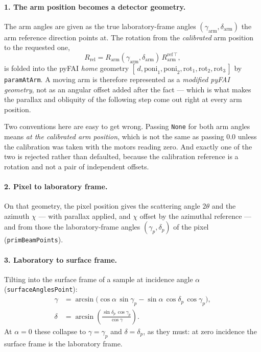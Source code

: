 \documentclass[11pt,a4paper]{article}
\newcommand{\code}[1]{\texttt{\small #1}}
\begin{document}
\paragraph{1. The arm position becomes a detector geometry.} The arm angles
are given as the true laboratory-frame angles
$(\gamma_{\mathrm{arm}}, \delta_{\mathrm{arm}})$ the arm reference direction
points at. The rotation from the \emph{calibrated} arm position to the
requested one,
\begin{equation}
  R_{\mathrm{rel}} = R_{\mathrm{arm}}(\gamma_{\mathrm{arm}},
                                      \delta_{\mathrm{arm}})\,
                     R_{\mathrm{arm}}^{\mathrm{ref}\,\top} ,
\end{equation}
is folded into the pyFAI \emph{home} geometry
$[\,d, \mathrm{poni}_1, \mathrm{poni}_2, \mathrm{rot}_1, \mathrm{rot}_2,
\mathrm{rot}_3\,]$ by \code{paramAtArm}. A moving arm is therefore represented
as a \emph{modified pyFAI geometry}, not as an angular offset added after the
fact --- which is what makes the parallax and obliquity of the following step
come out right at every arm position.

Two conventions here are easy to get wrong. Passing \code{None} for both arm
angles means \emph{at the calibrated arm position}, which is not the same as
passing $0.0$ unless the calibration was taken with the motors reading zero.
And exactly one of the two is rejected rather than defaulted, because the
calibration reference is a rotation and not a pair of independent offsets.

\paragraph{2. Pixel to laboratory frame.} On that geometry, the pixel position
gives the scattering angle $2\theta$ and the azimuth $\chi$ --- with parallax
applied, and $\chi$ offset by the azimuthal reference --- and from those the
laboratory-frame angles $(\gamma_p, \delta_p)$ of the pixel
(\code{primBeamPoints}).

\paragraph{3. Laboratory to surface frame.} Tilting into the surface frame of
a sample at incidence angle $\alpha$ (\code{surfaceAnglesPoint}):
\begin{align}
  \gamma &= \arcsin\bigl(\cos\alpha \, \sin\gamma_p
            - \sin\alpha \, \cos\delta_p \, \cos\gamma_p \bigr) ,
  \label{eq:gamma}\\[2pt]
  \delta &= \arcsin\!\left(
            \frac{\sin\delta_p \, \cos\gamma_p}{\cos\gamma} \right) .
  \label{eq:delta}
\end{align}
At $\alpha = 0$ these collapse to $\gamma = \gamma_p$ and
$\delta = \delta_p$, as they must: at zero incidence the surface frame is the
laboratory frame.
\end{document}
